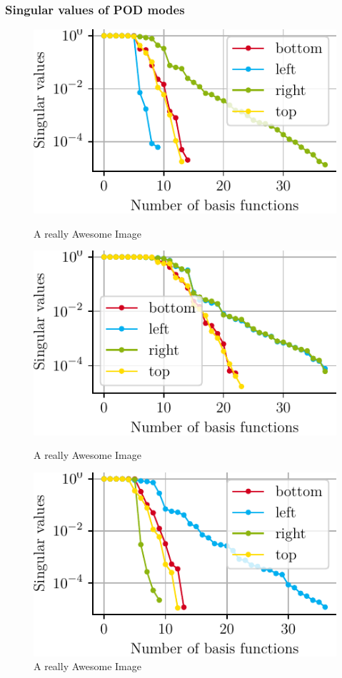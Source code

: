\documentclass[a4paper]{eccomas_paper-2024}
\begin{document}
\subsubsection{Singular values of POD modes}

\begin{figure}[!htb]
  \includegraphics[width=\linewidth]{../figures/beam/fig_loc_svals_left.pdf}
  \caption{A really Awesome Image}\label{fig:loc_svals_left}
\endminipage\hfill
{}
  \includegraphics[width=\linewidth]{../figures/beam/fig_loc_svals_inner.pdf}
  \caption{A really Awesome Image}\label{fig:loc_svals_inner}
\endminipage\hfill
{}%
  \includegraphics[width=\linewidth]{../figures/beam/fig_loc_svals_right.pdf}
  \caption{A really Awesome Image}\label{fig:loc_svals_right}
\endminipage
\end{figure}
\end{document}
